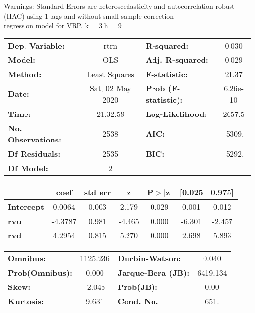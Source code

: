 Warnings: \newline
 [1] Standard Errors are heteroscedasticity and autocorrelation robust (HAC) using 1 lags and without small sample correction\\ 

regression model for VRP, k = 3 h = 9\begin{center}
\begin{tabular}{lclc}
\toprule
\textbf{Dep. Variable:}    &       rtrn       & \textbf{  R-squared:         } &     0.030   \\
\textbf{Model:}            &       OLS        & \textbf{  Adj. R-squared:    } &     0.029   \\
\textbf{Method:}           &  Least Squares   & \textbf{  F-statistic:       } &     21.37   \\
\textbf{Date:}             & Sat, 02 May 2020 & \textbf{  Prob (F-statistic):} &  6.26e-10   \\
\textbf{Time:}             &     21:32:59     & \textbf{  Log-Likelihood:    } &    2657.5   \\
\textbf{No. Observations:} &        2538      & \textbf{  AIC:               } &    -5309.   \\
\textbf{Df Residuals:}     &        2535      & \textbf{  BIC:               } &    -5292.   \\
\textbf{Df Model:}         &           2      & \textbf{                     } &             \\
\bottomrule
\end{tabular}
\begin{tabular}{lcccccc}
                   & \textbf{coef} & \textbf{std err} & \textbf{z} & \textbf{P$> |$z$|$} & \textbf{[0.025} & \textbf{0.975]}  \\
\midrule
\textbf{Intercept} &       0.0064  &        0.003     &     2.179  &         0.029        &        0.001    &        0.012     \\
\textbf{rvu}       &      -4.3787  &        0.981     &    -4.465  &         0.000        &       -6.301    &       -2.457     \\
\textbf{rvd}       &       4.2954  &        0.815     &     5.270  &         0.000        &        2.698    &        5.893     \\
\bottomrule
\end{tabular}
\begin{tabular}{lclc}
\textbf{Omnibus:}       & 1125.236 & \textbf{  Durbin-Watson:     } &    0.040  \\
\textbf{Prob(Omnibus):} &   0.000  & \textbf{  Jarque-Bera (JB):  } & 6419.134  \\
\textbf{Skew:}          &  -2.045  & \textbf{  Prob(JB):          } &     0.00  \\
\textbf{Kurtosis:}      &   9.631  & \textbf{  Cond. No.          } &     651.  \\
\bottomrule
\end{tabular}
\end{center}

